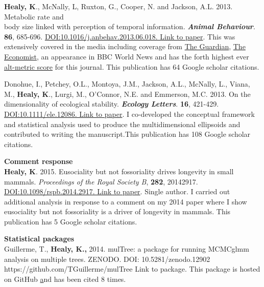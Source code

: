 \documentclass[10pt,a4paper]{article}
\begin{document}
\begin{flushleft}
\bigskip

\textbf{Healy, K}., McNally, L, Ruxton, G., Cooper, N. and Jackson, A.L. 2013. Metabolic rate and\\
body size linked with perception of temporal information.  \textit{\textbf{Animal Behaviour}}. \textbf{86}, 685-696. \href{http://dx.doi.org/10.1016/j.anbehav.2013.06.018}{DOI:10.1016/j.anbehav.2013.06.018. Link to paper}. This was extensively covered in the media including coverage from 
\href{https://www.theguardian.com/science/2013/sep/16/time-passes-slowly-flies-study}{The Guardian}, 
\href{http://www.economist.com/news/science-and-technology/21586532-small-creatures-fast-metabolisms-see-world-action-replay-slo-mo}{The Economist},
 an appearance in BBC World News and has the forth highest ever \href{http://www.altmetric.com/details.php?key=517059da36b98ab7d4941284da32e5f7&citation_id=1705703&embedded=true}{alt-metric score} for this journal. This publication has 64 Google scholar citations. 

\bigskip

\setlength{\parindent}{0mm}Donohue, I., Petchey, O.L., Montoya, J.M., Jackson, A.L., McNally, L., Viana, M., \textbf{Healy, K}., Lurgi, M., O’Connor, N.E. and Emmerson, M.C. 2013. On the dimensionality of ecological stability. \textit{\textbf{Ecology Letters}}. \textbf{16}, 421-429. \href{http://onlinelibrary.wiley.com/doi/10.1111/ele.12086/abstract} {DOI:10.1111/ele.12086. Link to paper}. I co-developed the conceptual framework and statistical analysis used to produce the multidimensional ellipsoids and contributed to writing the manuscript.This publication has 108 Google scholar citations.
\bigskip


\textbf{Comment response}\\
\setlength{\parindent}{0mm}\textbf{Healy, K}. 2015.  Eusociality but not fossoriality drives longevity in small mammals. \textit{\textit{Proceedings of the Royal Society B}}, \textbf{282}, 20142917. \href{http://rspb.royalsocietypublishing.org/content/282/1806/20142917} {DOI:10.1098/rspb.2014.2917. Link to paper}.  Single author. I carried out additional analysis in response to a comment on my 2014 paper where I show eusociality but not fossoriality is a driver of longevity in mammals. This publication has 5 Google scholar citations.

\bigskip

\textbf{Statistical packages}\\
\setlength{\parindent}{0mm} Guillerme, T., \textbf{Healy, K.,} 2014. mulTree: a package for running MCMCglmm analysis on multiple trees. ZENODO. DOI: 10.5281/zenodo.12902 {https://github.com/TGuillerme/mulTree Link to package}. This package is hosted on GitHub \href{https://github.com/TGuillerme/mulTree} and has been cited 8 times.


\end{flushleft}
\end{document}
